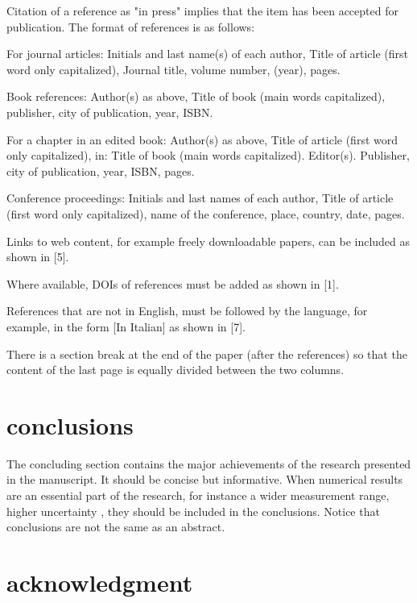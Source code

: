 \documentclass[10pt]{imeko_acta}
\begin{document}
Citation of a reference as "in press" implies that the item has been accepted for publication.
The format of references is as follows:

\begin{enumerate-a}
	\item For journal articles: Initials and last name(s) of each author, Title of article (first word only capitalized), Journal title, volume number, (year), pages.
	\item Book references: Author(s) as above, Title of book (main words capitalized), publisher, city of publication, year, ISBN. 
	\item For a chapter in an edited book: Author(s) as above, Title of article (first word only capitalized), in: Title of book (main words capitalized). Editor(s). Publisher, city of publication, year, ISBN, pages.
	\item Conference proceedings: Initials and last names of each author, Title of article (first word only capitalized), name of the conference, place, country, date, pages.
	\item Links to web content, for example freely downloadable papers, can be included as shown in [5].
	\item Where available, DOIs of references must be added as shown in [1].
	\item References that are not in English, must be followed by the language, for example, in the form [In Italian] as shown in [7].
\end{enumerate-a}

There is a section break at the end of the paper (after the references) so that the content of the last page is equally divided between the two columns.


\section{conclusions}
The concluding section contains the major achievements of the research presented in the manuscript. It should be concise but informative. When numerical results are an essential part of the research, for instance a wider measurement range, higher uncertainty \cite{Pop2006}, they should be included in the conclusions.
Notice that conclusions are not the same as an abstract. 

\section*{acknowledgment} 
\end{document}
